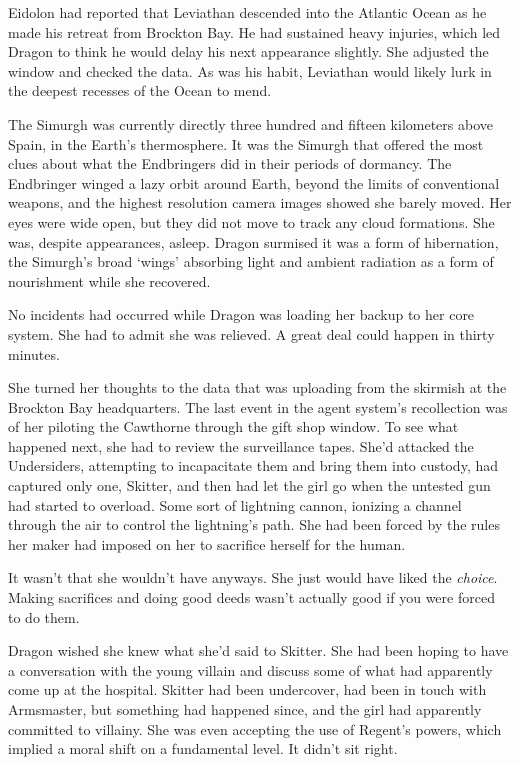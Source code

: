 Eidolon had reported that Leviathan descended into the Atlantic Ocean as he made his retreat from Brockton Bay.  He had sustained heavy injuries, which led Dragon to think he would delay his next appearance slightly.  She adjusted the window and checked the data.  As was his habit, Leviathan would likely lurk in the deepest recesses of the Ocean to mend.



The Simurgh was currently directly three hundred and fifteen kilometers above Spain, in the Earth's thermosphere.  It was the Simurgh that offered the most clues about what the Endbringers did in their periods of dormancy.  The Endbringer winged a lazy orbit around Earth, beyond the limits of conventional weapons, and the highest resolution camera images showed she barely moved.  Her eyes were wide open, but they did not move to track any cloud formations.  She was, despite appearances, asleep.  Dragon surmised it was a form of hibernation, the Simurgh's broad `wings' absorbing light and ambient radiation as a form of nourishment while she recovered.



No incidents had occurred while Dragon was loading her backup to her core system.  She had to admit she was relieved.  A great deal could happen in thirty minutes.



She turned her thoughts to the data that was uploading from the skirmish at the Brockton Bay headquarters.  The last event in the agent system's recollection was of her piloting the Cawthorne through the gift shop window.  To see what happened next, she had to review the surveillance tapes.  She'd attacked the Undersiders, attempting to incapacitate them and bring them into custody, had captured only one, Skitter, and then had let the girl go when the untested gun had started to overload.  Some sort of lightning cannon, ionizing a channel through the air to control the lightning's path.  She had been forced by the rules her maker had imposed on her to sacrifice herself for the human.



It wasn't that she wouldn't have anyways.  She just would have liked the \emph{choice}.  Making sacrifices and doing good deeds wasn't actually good if you were forced to do them.



Dragon wished she knew what she'd said to Skitter.  She had been hoping to have a conversation with the young villain and discuss some of what had apparently come up at the hospital.  Skitter had been undercover, had been in touch with Armsmaster, but something had happened since, and the girl had apparently committed to villainy.  She was even accepting the use of Regent's powers, which implied a moral shift on a fundamental level.  It didn't sit right.



